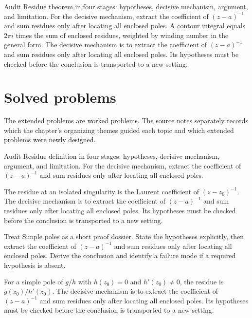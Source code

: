 \begin{example}\label{ex:iv10-worked-04}
Audit Residue theorem in four stages: hypotheses, decisive mechanism, argument, and limitation. For the decisive mechanism, extract the coefficient of \((z-a)^{-1}\) and sum residues only after locating all enclosed poles. A contour integral equals $2\pi i$ times the sum of enclosed residues, weighted by winding number in the general form. The decisive mechanism is to extract the coefficient of \((z-a)^{-1}\) and sum residues only after locating all enclosed poles. Its hypotheses must be checked before the conclusion is transported to a new setting.
\end{example}

\section{Solved problems}
The extended problems are worked problems. The source notes separately records which the chapter's organizing themes guided each topic and which extended problems were newly designed.

\begin{problem}\label{prob:iv10-problem-01}
Audit Residue definition in four stages: hypotheses, decisive mechanism, argument, and limitation. For the decisive mechanism, extract the coefficient of \((z-a)^{-1}\) and sum residues only after locating all enclosed poles.
\end{problem}
\begin{solution}
The residue at an isolated singularity is the Laurent coefficient of $(z-z_0)^{-1}$. The decisive mechanism is to extract the coefficient of \((z-a)^{-1}\) and sum residues only after locating all enclosed poles. Its hypotheses must be checked before the conclusion is transported to a new setting.
\end{solution}

\begin{problem}\label{prob:iv10-problem-02}
Treat Simple poles as a short proof dossier. State the hypotheses explicitly, then extract the coefficient of \((z-a)^{-1}\) and sum residues only after locating all enclosed poles. Derive the conclusion and identify a failure mode if a required hypothesis is absent.
\end{problem}
\begin{solution}
For a simple pole of $g/h$ with $h(z_0)=0$ and $h'(z_0)\ne0$, the residue is $g(z_0)/h'(z_0)$. The decisive mechanism is to extract the coefficient of \((z-a)^{-1}\) and sum residues only after locating all enclosed poles. Its hypotheses must be checked before the conclusion is transported to a new setting.
\end{solution}

